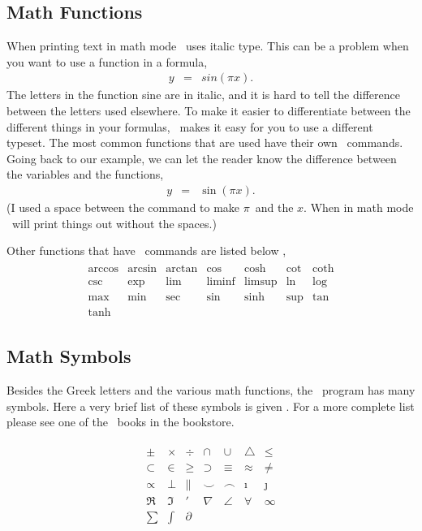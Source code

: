 \subsection{Math Functions}
When printing text in math mode \lat\ uses italic type.  This 
can be a problem when you want to use a function in a formula,
\begin{eqnarray}
y & = & sin(\pi x).
\end{eqnarray}
The letters in the function sine are in italic, and it is hard to tell
the difference between the letters used elsewhere.  To make it easier
to differentiate between the different things in your formulas, \lat\
makes it easy for you to use a different typeset.  The most common
functions that are used have their own \lat\ commands.  Going back to
our example, we can let the reader know the difference between the
variables and the functions,
\begin{eqnarray}
y & = & \sin( \pi x).
\end{eqnarray}
(I used a space between the command to make $\pi$\ and the $x$.
When in math mode \lat\ will print things out without the spaces.)

Other functions that have \lat\ commands are listed below \cite{The-Manual},
\begin{eqnarray}
   \begin{array}{lllllll}
      \arccos & \arcsin & \arctan & \cos    & \cosh   & \cot & \coth \\
      \csc    & \exp    & \lim    & \liminf & \limsup & \ln  & \log  \\
      \max    & \min    & \sec    & \sin    & \sinh   & \sup & \tan \\
      \tanh
   \end{array}
\end{eqnarray}

\subsection{Math Symbols}
Besides the Greek letters and the various math functions, the \lat\ 
program has many symbols.  Here a very brief list of these symbols
is given \cite{The-Manual}.  For a more complete list please see one of the \lat\ 
books in the bookstore.

\begin{eqnarray}
   \begin{array}{lllllll}
      \pm     & \times  & \div      & \cap    & \cup   & \triangle & \leq \\
      \subset & \in     & \geq      & \supset & \equiv & \approx   & \neq \\
      \propto & \perp   & \parallel & \smile  & \frown & \imath    & \jmath \\
      \Re     & \Im     & \prime    & \nabla  & \angle & \forall   & \infty \\
      \sum    & \int    & \partial
   \end{array}
\end{eqnarray}





